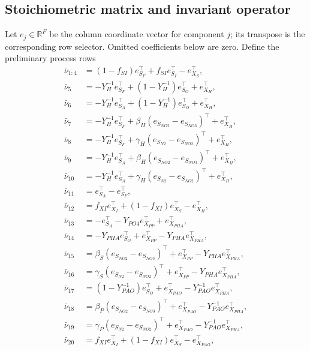 \documentclass[a4paper,fleqn]{cas-sc}
\newcommand{\R}{\mathbb{R}}
\begin{document}
\subsection{Stoichiometric matrix and invariant operator}
\label{app:stoichiometry}

Let $e_j\in\R^F$ be the column coordinate vector for component $j$; its transpose is the corresponding row selector. Omitted coefficients below are zero. Define the preliminary process rows
\begin{align}
\bar\nu_{1:4}&=(1-f_{SI})e_{S_F}^\top+f_{SI}e_{S_I}^\top-e_{X_S}^\top,\\
\bar\nu_5&=-Y_H^{-1}e_{S_F}^\top+(1-Y_H^{-1})e_{S_O}^\top+e_{X_H}^\top,\\
\bar\nu_6&=-Y_H^{-1}e_{S_A}^\top+(1-Y_H^{-1})e_{S_O}^\top+e_{X_H}^\top,\\
\bar\nu_7&=-Y_H^{-1}e_{S_F}^\top+\beta_H(e_{S_{NO2}}-e_{S_{NO3}})^\top+e_{X_H}^\top,\\
\bar\nu_8&=-Y_H^{-1}e_{S_F}^\top+\gamma_H(e_{S_{N2}}-e_{S_{NO2}})^\top+e_{X_H}^\top,\\
\bar\nu_9&=-Y_H^{-1}e_{S_A}^\top+\beta_H(e_{S_{NO2}}-e_{S_{NO3}})^\top+e_{X_H}^\top,\\
\bar\nu_{10}&=-Y_H^{-1}e_{S_A}^\top+\gamma_H(e_{S_{N2}}-e_{S_{NO2}})^\top+e_{X_H}^\top,\\
\bar\nu_{11}&=e_{S_A}^\top-e_{S_F}^\top,\\
\bar\nu_{12}&=f_{XI}e_{X_I}^\top+(1-f_{XI})e_{X_S}^\top-e_{X_H}^\top,\\
\bar\nu_{13}&=-e_{S_A}^\top-Y_{PO4}e_{X_{PP}}^\top+e_{X_{PHA}}^\top,\\
\bar\nu_{14}&=-Y_{PHA}e_{S_O}^\top+e_{X_{PP}}^\top-Y_{PHA}e_{X_{PHA}}^\top,\\
\bar\nu_{15}&=\beta_S(e_{S_{NO2}}-e_{S_{NO3}})^\top+e_{X_{PP}}^\top-Y_{PHA}e_{X_{PHA}}^\top,\\
\bar\nu_{16}&=\gamma_S(e_{S_{N2}}-e_{S_{NO2}})^\top+e_{X_{PP}}^\top-Y_{PHA}e_{X_{PHA}}^\top,\\
\bar\nu_{17}&=(1-Y_{PAO}^{-1})e_{S_O}^\top+e_{X_{PAO}}^\top-Y_{PAO}^{-1}e_{X_{PHA}}^\top,\\
\bar\nu_{18}&=\beta_P(e_{S_{NO2}}-e_{S_{NO3}})^\top+e_{X_{PAO}}^\top-Y_{PAO}^{-1}e_{X_{PHA}}^\top,\\
\bar\nu_{19}&=\gamma_P(e_{S_{N2}}-e_{S_{NO2}})^\top+e_{X_{PAO}}^\top-Y_{PAO}^{-1}e_{X_{PHA}}^\top,\\
\bar\nu_{20}&=f_{XI}e_{X_I}^\top+(1-f_{XI})e_{X_S}^\top-e_{X_{PAO}}^\top,\\

\end{align}
\end{document}

